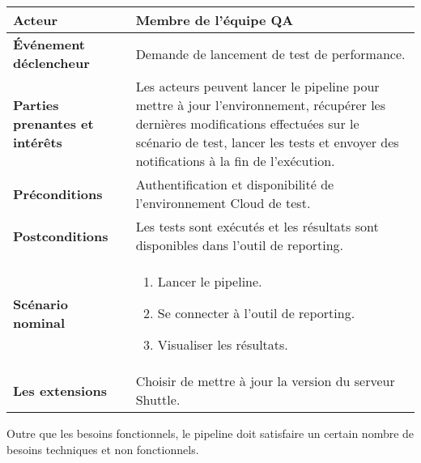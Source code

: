 \begin{spacing}{1.2}
\begin{table}[ht]
\begin{tabularx}{\textwidth}{|p{3.3cm}|X|}
          \hline
          {\textbf{Acteur}}
          & 
          Membre de l'équipe QA
          \\
          \hline
          {\textbf{Événement déclencheur}}
          & 
         Demande de lancement de test de performance.
          \\
          \hline
          {\textbf{Parties prenantes et intérêts}}
          & 
          Les acteurs peuvent lancer le pipeline pour mettre à jour l'environnement, récupérer les dernières modifications effectuées sur le scénario de test, lancer les tests et envoyer des notifications à la fin de l'exécution.
          \\
          \hline
          {\textbf{Préconditions}}
          & 
          Authentification et disponibilité de l'environnement Cloud de test.
          \\
          \hline
          {\textbf{Postconditions}}
          & 
          Les tests sont exécutés et les résultats sont disponibles dans l'outil de reporting.
          \\
          \hline
          {\textbf{Scénario nominal}}
          & 
          \vspace{-3mm}
          \begin{enumerate}
          \setlength\itemsep{0em}
              \item Lancer le pipeline.
              \item Se connecter à l'outil de reporting.
              \item Visualiser les résultats.
          \end{enumerate}
          \\
          \hline
          {\textbf{Les extensions}}
          &  
          Choisir de mettre à jour la version du serveur Shuttle.
          \\
          \hline
        \end{tabularx}
	\label{tab:exple}
\end{table}
\FloatBarrier
Outre que les besoins fonctionnels, le pipeline doit satisfaire un certain nombre de besoins techniques et non fonctionnels.

\end{spacing}

